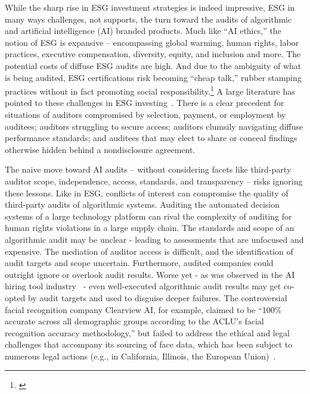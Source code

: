 \documentclass[sigconf]{acmart}
\begin{document}
While the sharp rise in ESG investment strategies is indeed impressive, ESG in many ways challenges, not supports, the turn toward the audits of algorithmic and artificial intelligence (AI) branded products. Much like “AI ethics,” the notion of ESG is expansive – encompassing global warming, human rights, labor practices, executive compensation, diversity, equity, and inclusion and more. The potential costs of diffuse ESG audits are high. 
And due to the ambiguity of what is being audited, ESG certifications risk becoming “cheap talk,” rubber stamping practices without in fact promoting social responsibility.\footnote{\citet[][noting “many companies seem to be doing the minimum necessary to say they obtained assurance on some of their sustainability reporting and many assurance providers are using standards that are so general and discretionary as to provide the consumers of ESG reporting little practical assurance.”]{rossseymour}} A large literature has pointed to these challenges in ESG investing~\cite{rossseymour,o2021esg,eccles2012need, kim2020analyzing,boffo2020esg,pollman2019corporate,kotsantonis2019four}.
There is a clear precedent for situations of auditors compromised by selection, payment, or employment by auditees; auditors struggling to secure access; auditors clumsily navigating diffuse performance standards; and auditees that may elect to share or conceal findings otherwise hidden behind a nondisclosure agreement.


The naive move toward AI audits – without considering facets like third-party auditor scope, independence, access, standards, and transparency – risks ignoring these lessons.
Like in ESG, conflicts of interest can compromise the quality of third-party audits of algorithmic systems. 
Auditing the automated decision systems of a large technology platform can rival the complexity of auditing for human rights violations in a large supply chain.
The standards and scope of an algorithmic audit may be unclear - leading to assessments that are unfocused and expensive. The mediation of auditor access is difficult, and the identification of audit targets and scope uncertain. 
Furthermore, audited companies could outright ignore or overlook audit results. 
Worse yet - as was observed in the AI hiring tool industry~\cite{sloaneaudit,sloane2021silicon} - even well-executed algorithmic audit results may get co-opted by audit targets and used to disguise deeper failures. 
The controversial facial recognition company Clearview AI, for example, claimed to be “100\% accurate across all demographic groups according to the ACLU’s facial recognition accuracy methodology,” but failed to address the ethical and legal challenges that accompany its sourcing of face data, which has been subject to numerous legal actions (e.g., in California, Illinois, the European Union)~\cite{ACLUClearview}. 
\end{document}
